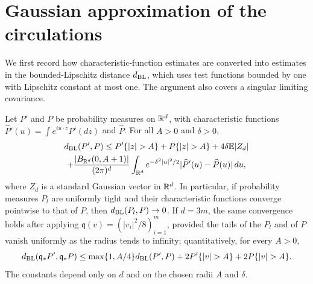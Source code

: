 \section{Gaussian approximation of the circulations}\label{ch29:sec:gaussian}

We first record how characteristic-function estimates are converted into estimates in the bounded-Lipschitz distance $d_{\mathrm{BL}}$, which uses test functions bounded by one with Lipschitz constant at most one. The argument also covers a singular limiting covariance.

\begin{lemma}\label{ch29:lem:smoothing}
Let $P'$ and $P$ be probability measures on $\mathbb R^d$, with characteristic functions $\widehat P'(u)=\int e^{iu\cdot z}P'(dz)$ and $\widehat P$. For all $A>0$ and $\delta>0$,
\begin{multline}\label{ch29:eq:smoothing-bound}
 \BLdist(P',P)\le P'\{|z|>A\}+P\{|z|>A\}+4\delta\E|Z_d|\\
 +\frac{|B_{\R^d}(0,A+1)|}{(2\pi)^d}\int_{\R^d}e^{-\delta^2|u|^2/2}|\widehat P'(u)-\widehat P(u)|\,du,
\end{multline}
where $Z_d$ is a standard Gaussian vector in $\mathbb R^d$. In particular, if probability measures $P_l$ are uniformly tight and their characteristic functions converge pointwise to that of $P$, then $d_{\mathrm{BL}}(P_l,P)\to0$. If $d=3m$, the same convergence holds after applying $\mathfrak q(v)=(|v_i|^2/8)_{i=1}^m$, provided the tails of the $P_l$ and of $P$ vanish uniformly as the radius tends to infinity; quantitatively, for every $A>0$,
\begin{equation}\label{ch29:eq:quadratic-truncation}
 \BLdist(\mathfrak q_*P',\mathfrak q_*P)\le\max\{1,A/4\}\BLdist(P',P)+2P'\{|v|>A\}+2P\{|v|>A\}.
\end{equation}
The constants depend only on $d$ and on the chosen radii $A$ and $\delta$.
\end{lemma}

